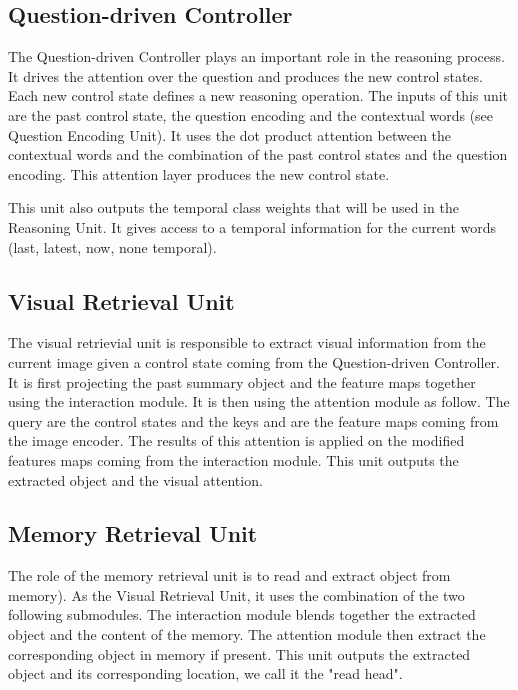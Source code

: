 	

\subsection{Question-driven Controller}

The Question-driven Controller plays an important role in the reasoning process.
It drives the attention over the question and produces the new control states. Each new control state defines a new reasoning operation. The inputs of this unit are the past control state, the question encoding and the contextual words (see Question Encoding Unit). It uses the dot product attention between the contextual words
and the combination of the past control states and the question encoding.  This attention layer produces the new control state.

This unit also outputs the temporal class weights that will be used in the Reasoning Unit. It gives access to a temporal information for the current words (last, latest, now, none temporal).

\subsection{Visual Retrieval Unit}

The visual retrievial unit is responsible to extract visual information from the current image given a control state coming from the Question-driven Controller. It is first projecting the past summary object and the feature maps together using the interaction module.
It is then using the attention module as follow. The query are the control states and the keys and are the feature maps coming from the image encoder. The results of this attention is applied on the modified features maps coming from the interaction module.  
This unit outputs the extracted object and the visual attention.

\subsection{Memory Retrieval Unit}

The role of the memory retrieval unit is to read and extract object from memory).
As the Visual Retrieval Unit, it uses the combination of the two following submodules. The interaction module blends together the extracted object and the content of the memory. The attention module then extract the corresponding object in memory if present. This unit outputs the extracted object and its corresponding location, we call it the "read head".


